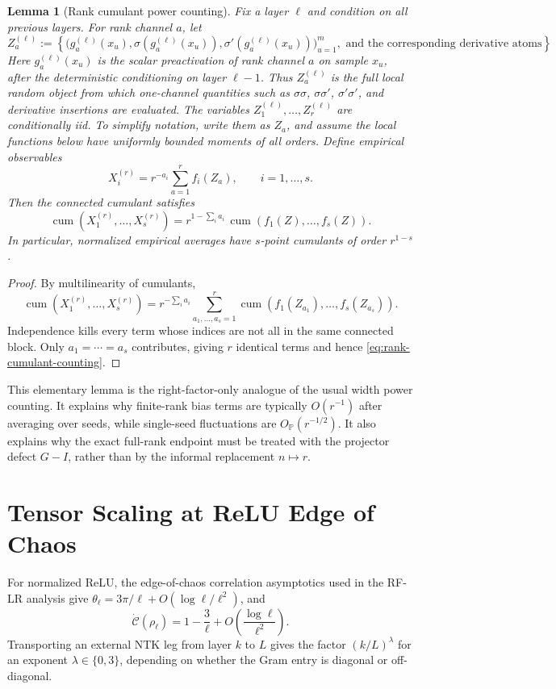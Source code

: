 \documentclass{article}
\newtheorem{lemma}[theorem]{Lemma}
\newcommand{\Pp}{\mathbb P}
\newcommand{\cumul}{\operatorname{cum}}
\begin{document}
\begin{lemma}[Rank cumulant power counting]
\label{lem:rank-cumulant-counting}
Fix a layer \(\ell\) and condition on all previous layers. For rank channel \(a\), let
\[
Z_a^{(\ell)}
:=
\left\{
\bigl(g_a^{(\ell)}(x_u),\sigma(g_a^{(\ell)}(x_u)),\sigma'(g_a^{(\ell)}(x_u))\bigr)_{u=1}^{m},
\text{ and the corresponding derivative atoms}
\right\}.
\]
Here \(g_a^{(\ell)}(x_u)\) is the scalar preactivation of rank channel \(a\) on sample \(x_u\), after the deterministic conditioning on layer \(\ell-1\). Thus \(Z_a^{(\ell)}\) is the full local random object from which one-channel quantities such as \(\sigma\sigma\), \(\sigma\sigma'\), \(\sigma'\sigma'\), and derivative insertions are evaluated. The variables \(Z_1^{(\ell)},\ldots,Z_r^{(\ell)}\) are conditionally iid. To simplify notation, write them as \(Z_a\), and assume the local functions below have uniformly bounded moments of all orders. Define empirical observables
\[
X_i^{(r)}=r^{-a_i}\sum_{a=1}^{r} f_i(Z_a),
\qquad i=1,\ldots,s.
\]
Then the connected cumulant satisfies
\begin{equation}
\cumul\left(X_1^{(r)},\ldots,X_s^{(r)}\right)
=r^{1-\sum_i a_i}\,
\cumul\left(f_1(Z),\ldots,f_s(Z)\right).
\label{eq:rank-cumulant-counting}
\end{equation}
In particular, normalized empirical averages have \(s\)-point cumulants of order \(r^{1-s}\).
\end{lemma}

\begin{proof}
By multilinearity of cumulants,
\[
\cumul(X_1^{(r)},\ldots,X_s^{(r)})
=r^{-\sum_i a_i}
\sum_{a_1,\ldots,a_s=1}^{r}
\cumul(f_1(Z_{a_1}),\ldots,f_s(Z_{a_s})).
\]
Independence kills every term whose indices are not all in the same connected block. Only \(a_1=\cdots=a_s\) contributes, giving \(r\) identical terms and hence \eqref{eq:rank-cumulant-counting}.
\end{proof}

This elementary lemma is the right-factor-only analogue of the usual width power counting. It explains why finite-rank bias terms are typically \(O(r^{-1})\) after averaging over seeds, while single-seed fluctuations are \(O_{\Pp}(r^{-1/2})\). It also explains why the exact full-rank endpoint must be treated with the projector defect \(G-I\), rather than by the informal replacement \(n\mapsto r\).

\section{Tensor Scaling at ReLU Edge of Chaos}
For normalized ReLU, the edge-of-chaos correlation asymptotics used in the RF-LR analysis \citep{RFLR2026} give
\(\theta_\ell=3\pi/\ell+O(\log \ell/\ell^2)\), and
\begin{equation}
\dot{\mathcal C}(\rho_\ell)=1-\frac3\ell+O\left(\frac{\log\ell}{\ell^2}\right).
\label{eq:relu-transport}
\end{equation}
Transporting an external NTK leg from layer \(k\) to \(L\) gives the factor \((k/L)^\lambda\) for an exponent \(\lambda\in\{0,3\}\), depending on whether the Gram entry is diagonal or off-diagonal.
\end{document}
